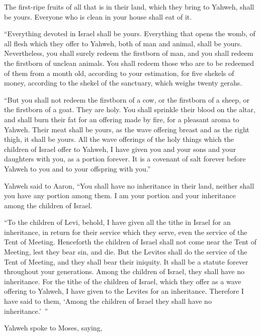 {The first-ripe fruits of all that is in their land, which they bring to Yahweh, shall be yours. Everyone who is clean in your house shall eat of it.
\par }{\PP {}“Everything devoted in Israel shall be yours.
Everything that opens the womb, of all flesh which they offer to Yahweh, both of man and animal, shall be yours. Nevertheless, you shall surely redeem the firstborn of man, and you shall redeem the firstborn of unclean animals.
You shall redeem those who are to be redeemed of them from a month old, according to your estimation, for five shekels of money, according to the shekel of the sanctuary, which weighs twenty gerahs.
\par }{\PP {}“But you shall not redeem the firstborn of a cow, or the firstborn of a sheep, or the firstborn of a goat. They are holy. You shall sprinkle their blood on the altar, and shall burn their fat for an offering made by fire, for a pleasant aroma to Yahweh.
Their meat shall be yours, as the wave offering breast and as the right thigh, it shall be yours.
All the wave offerings of the holy things which the children of Israel offer to Yahweh, I have given you and your sons and your daughters with you, as a portion forever. It is a covenant of salt forever before Yahweh to you and to your offspring with you.”
\par }{\PP {}Yahweh said to Aaron, “You shall have no inheritance in their land, neither shall you have any portion among them. I am your portion and your inheritance among the children of Israel.
\par }{\PP {}“To the children of Levi, behold, I have given all the tithe in Israel for an inheritance, in return for their service which they serve, even the service of the Tent of Meeting.
Henceforth the children of Israel shall not come near the Tent of Meeting, lest they bear sin, and die.
But the Levites shall do the service of the Tent of Meeting, and they shall bear their iniquity. It shall be a statute forever throughout your generations. Among the children of Israel, they shall have no inheritance.
For the tithe of the children of Israel, which they offer as a wave offering to Yahweh, I have given to the Levites for an inheritance. Therefore I have said to them, ‘Among the children of Israel they shall have no inheritance.’ ”
\par }{\PP {}Yahweh spoke to Moses, saying,
}
